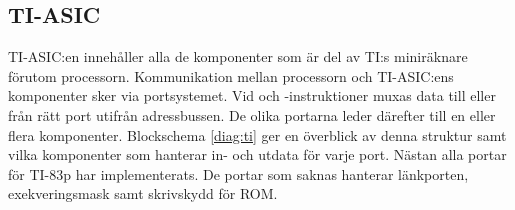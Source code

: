 \documentclass[main.tex]{subfiles}
\begin{document}
\subsection{TI-ASIC}
TI-ASIC:en innehåller alla de komponenter som är del av TI:s miniräknare
förutom processorn. Kommunikation mellan processorn och TI-ASIC:ens komponenter
sker via portsystemet. Vid  och -instruktioner muxas data
till eller från rätt port utifrån adressbussen. De olika portarna leder
därefter till en eller flera komponenter. Blockschema \ref{diag:ti} ger en
överblick av denna struktur samt vilka komponenter som hanterar in- och utdata
för varje port. Nästan alla portar för TI-83p har implementerats. De portar som
saknas hanterar länkporten, exekveringsmask samt skrivskydd för ROM.





\end{document}
